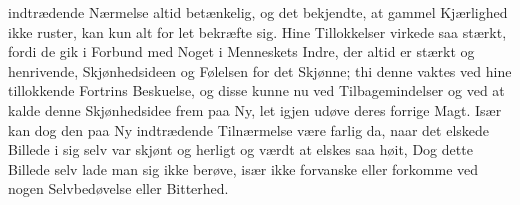 \documentclass[12pt,a4paper]{book}
\begin{document}
indtrædende Nærmelse altid betænkelig, og det bekjendte, at gammel
Kjærlighed ikke ruster, kan kun alt for let bekræfte sig. Hine
Tillokkelser virkede saa stærkt, fordi de gik i Forbund med Noget i
Menneskets Indre, der altid er stærkt og henrivende, Skjønhedsideen og
Følelsen for det Skjønne; thi denne vaktes ved hine tillokkende Fortrins
Beskuelse, og disse kunne nu ved Tilbagemindelser og ved at kalde denne
Skjønhedsidee frem paa Ny, let igjen udøve deres forrige Magt. Især kan
dog den paa Ny indtrædende Tilnærmelse være farlig da, naar det elskede
Billede i sig selv var skjønt og herligt og værdt at elskes saa høit, Dog
dette Billede selv lade man sig ikke berøve, især ikke forvanske eller
forkomme ved nogen Selvbedøvelse eller Bitterhed.
\end{document}
